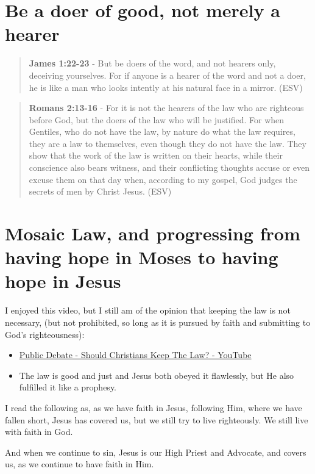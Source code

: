 \documentclass[11pt]{article}
\begin{document}
\section{Be a doer of good, not merely a hearer}
\label{sec:org1c2f4a4}
\begin{quote}
\textbf{James 1:22-23} -  But be doers of the word, and not hearers only, deceiving yourselves. For if anyone is a hearer of the word and not a doer, he is like a man who looks intently at his natural face in a mirror. (ESV)
\end{quote}

\begin{quote}
\textbf{Romans 2:13-16} - For it is not the hearers of the law who are righteous before God, but the doers of the law who will be justified.  For when Gentiles, who do not have the law, by nature do what the law requires, they are a law to themselves, even though they do not have the law.  They show that the work of the law is written on their hearts, while their conscience also bears witness, and their conflicting thoughts accuse or even excuse them on that day when, according to my gospel, God judges the secrets of men by Christ Jesus. (ESV)
\end{quote}

\section{Mosaic Law, and progressing from having hope in Moses to having hope in Jesus}
\label{sec:orge6eaeef}
I enjoyed this video, but I still am of the opinion that keeping the law is not necessary, (but not prohibited, so long as it is pursued by faith and submitting to God's righteousness):
\begin{itemize}
\item \href{https://www.youtube.com/watch?v=CNHKqhwu6Bo}{Public Debate - Should Christians Keep The Law? - YouTube}
\item The law is good and just and Jesus both obeyed it flawlessly, but He also fulfilled it like a prophesy.
\end{itemize}

I read the following as, as we have faith in Jesus, following Him, where we have fallen short, Jesus has covered us, but we still try to live righteously. We still live with faith in God.

And when we continue to sin, Jesus is our High Priest and Advocate, and covers us, as we continue to have faith in Him.
\end{document}
